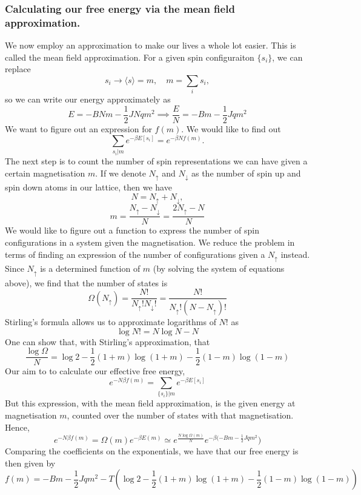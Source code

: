 \subsubsection{Calculating our free energy via the mean field approximation.}
We now employ an approximation to make our lives a whole lot easier. This is called the mean field approximation. For a given spin configuraiton $\{ s_i \} $, we can replace \[ 
	s_i  \rightarrow \langle s \rangle  = m, \quad 
	m = \sum_i s_i, 
\] 
so we can write our energy approximately as 
\[
	E = - BNm - \frac{1}{2} JN q m^2 \implies \frac{E}{N} =  - Bm - \frac{1}{2} J qm^2 
\]
We want to figure out an expression for $f(m)$. 
We would like to find out 
\[ 
	\sum_{s_i | m} e^{ - \beta E[s_i]} = e^{ - \beta N f(m)}. 
\] 
The next step is to count the number of spin representations we can have given a certain magnetisation  $m$. If we denote $N_{\uparrow}$ and $N_{\downarrow}$ as the number of spin up and spin down atoms in our lattice, then we have 
\[ 
	N  = N_{\uparrow} + N_{\downarrow}, 
 \] 
 \[ 
 	m = \frac{N_{\uparrow} - N_{\downarrow}}{N}  = \frac{2N_{\uparrow}  - N}{ N} 
  \] 
 We would like to figure out a function to express the number of spin configurations in a system given the magnetisation. We reduce the problem in terms of finding an expression of the number of configurations given a $N_{\uparrow}$ instead. 
Since $N_{\uparrow}$ is a determined function of $m$ (by solving the system of equations above), we find that the number of states is 
\[
	\Omega(N_{\uparrow}) = \frac{N !}{N_{\uparrow}! N_{\downarrow} !} = \frac{ N!}{ N_\uparrow ! ( N  - N_\uparrow)! }  
\]
Stirling's formula allows us to approximate logarithms of $N!$ as 
\[ 
	\log N!  = N \log N   - N 
\]
One can show that, with Stirling's approximation, that 
\[ 
 	\frac{ \log \Omega}{ N }  = \log 2  - \frac{1}{2} (1  +m) \log ( 1 + m)   - \frac{1}{2}(  1 - m ) \log (1 - m) 
\] 
Our aim to to calculate our effective free energy, 
\[ 
	e^{ - N\beta  f(m) } = \sum_{ \{ s_i \} | m } e^ { - \beta E [ s_i ]}\] 
But this expression, with the mean field approximation, is the given energy at magnetisation $m$, counted over the number of states with that magnetisation. Hence, 
\[ 
	e^{ - N \beta f( m) }  = \Omega(m) e^ { - \beta E( m ) } \simeq e^{ \frac{ N \log \Omega ( m) }{ N } } e^{  - \beta ( - B m - \frac{ 1}{ 2} J q m^2 }) \] 
Comparing the coefficients on the exponentials, we have that our free energy is then given by 
\[ 
	f(m) = - Bm  - \frac{1}{ 2} Jqm^2  -T \left( \log 2 - \frac{1}{2} ( 1 + m ) \log ( 1 + m ) - \frac{ 1}{2} ( 1- m ) \log ( 1- m ) \right) 
\] 
